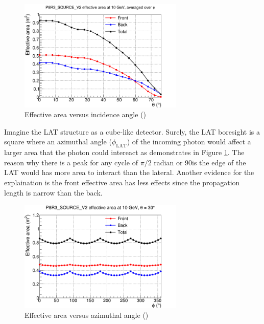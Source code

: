 \begin{figure}[h!]
    \centering
    \includegraphics[width=0.7\textwidth]{content/background/figures/eff_theta.png}
    \caption{Effective area versus incidence angle (\cite{lat_p8_performance})}
    \label{fig:eff_theta}
\end{figure}

Imagine the LAT structure as a cube-like detector. Surely, the LAT 
boresight is a square where an azimuthal angle ($\phi_\text{LAT}$) of the incoming 
photon would affect a larger area that the photon could intereact 
as demonstrates in Figure \ref{fig:eff_theta}. The reason why there 
is a peak for any cycle of $\pi/2$ radian or 90\textdegree is 
the edge of the LAT would has more area to interact than the 
lateral. Another evidence for the explaination is the front effective 
area has less effects since the propagation length is narrow than 
the back.

\begin{figure}[h!]
    \centering
    \includegraphics[width=0.7\textwidth]{content/background/figures/eff_phi.png}
    \caption{Effective area versus azimuthal angle (\cite{lat_p8_performance})}
    \label{fig:eff_phi}
\end{figure}

